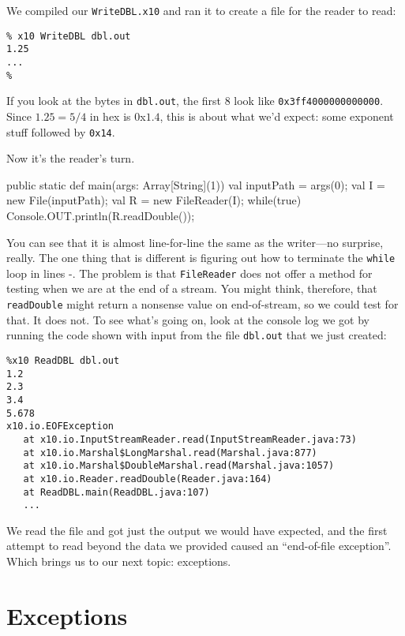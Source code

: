 We compiled our {\tt WriteDBL.x10} and ran it to create a file for the reader to
read:
\begin{verbatim}
% x10 WriteDBL dbl.out
1.25
...
%
\end{verbatim}
If you look at the bytes in {\tt dbl.out}, the first 8 look like {\tt 0x3ff4000000000000}.
Since $1.25 = 5/4$ in hex is 0x$1.4$, this is about what we'd expect: some 
exponent stuff followed by {\tt 0x14}.

Now it's the reader's turn.  

\begin{xtennum}[]
public static def main(args: Array[String](1)) {
   val inputPath  = args(0);
   val I  = new File(inputPath);
   val R  = new FileReader(I);
   while(true) {
     Console.OUT.println(R.readDouble());
   }
 } 
\end{xtennum}
You can see that it is almost line-for-line the same
as the writer---no surprise, really.  The one thing that is different is
figuring out how to terminate the {\tt while} loop in lines -.  The problem is
that {\tt FileReader} does not offer a method for testing when we are at the end
of a stream.  You might think, therefore, that {\tt readDouble} might return a
nonsense value on end-of-stream, so we could test for that.  It does not.  To
see what's going on, look at the console log we got by running the code shown
with input from the file {\tt dbl.out} that we just created:
\begin{verbatim}
%x10 ReadDBL dbl.out
1.2
2.3
3.4
5.678
x10.io.EOFException
   at x10.io.InputStreamReader.read(InputStreamReader.java:73)
   at x10.io.Marshal$LongMarshal.read(Marshal.java:877)
   at x10.io.Marshal$DoubleMarshal.read(Marshal.java:1057)
   at x10.io.Reader.readDouble(Reader.java:164)
   at ReadDBL.main(ReadDBL.java:107)
   ...
\end{verbatim}
We read the file and got just the output we would have expected, and the first
attempt to read beyond the data we provided caused an ``end-of-file exception''.
Which brings us to our next topic: exceptions.
\section{Exceptions}\label{sec:exc}
